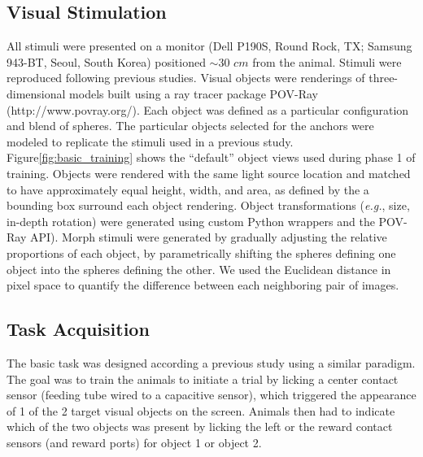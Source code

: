 \subsection{Visual Stimulation}
All stimuli were presented on a monitor (Dell P190S,
Round Rock, TX; Samsung 943-BT, Seoul, South Korea) positioned $\sim$30 $cm$ from the animal. Stimuli were reproduced following previous studies\cite{Zoccolan2009}. Visual objects were renderings of three-dimensional models built using a ray tracer package POV-Ray (http://www.povray.org/). Each object was defined as a particular configuration and blend of spheres. The particular objects selected for the anchors were modeled to replicate the stimuli used in a previous study\cite{Zoccolan2009}. Figure\ref{fig:basic_training} shows the ``default'' object views used during phase 1 of training. Objects were rendered with the same light source location and matched to have approximately equal height, width, and area, as defined by the a bounding box surround each object rendering. Object transformations (\textit{e.g.}, size, in-depth rotation) were generated using custom Python wrappers and the POV-Ray API). Morph stimuli were generated by gradually adjusting the relative proportions of each object, by parametrically shifting the spheres defining one object into the spheres defining the other. We used the Euclidean distance in pixel space to quantify the difference between each neighboring pair of images. 

\subsection{Task Acquisition}
The basic task was designed according a previous study using a similar paradigm\cite{Zoccolan2009}. The goal was to train the animals to initiate a trial by licking a center contact sensor (feeding tube wired to a capacitive sensor), which triggered the appearance of 1 of the 2 target visual objects on the screen. Animals then had to indicate which of the two objects was present by licking the left or the reward contact sensors (and reward ports) for object 1 or object 2. 

